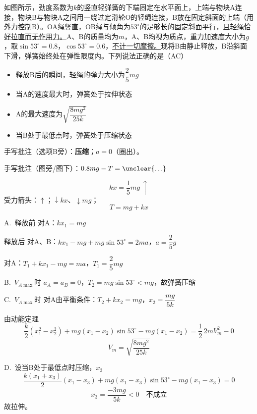 \begin{problem}[14（贴纸印刷题）]
如图所示，劲度系数为$k$的竖直轻弹簧的下端固定在水平面上，上端与物块A连接，物块B与物块A之间用一绕过定滑轮O的轻绳连接，B放在固定斜面的上端（用外力控制B）。OA绳竖直，OB绳与倾角为$53^\circ$的足够长的固定斜面平行，且\underline{轻绳恰好拉直而无作用力。}A、B的质量均为$m$，A、B均视为质点，重力加速度大小为$g$，取$\sin53^\circ=0.8$，$\cos53^\circ=0.6$，\underline{不计一切摩擦。}现将B由静止释放，B沿斜面下滑，弹簧始终处在弹性限度内。下列说法正确的是（AC）%

\begin{itemize}
\item[A.] 释放B后的瞬间，轻绳的弹力大小为$\dfrac{2}{5}mg$ %
\item[B.] 当A的速度最大时，弹簧处于拉伸状态 %
\item[C.] A的最大速度为$\sqrt{\dfrac{8mg^2}{25k}}$ %
\item[D.] 当B处于最低点时，弹簧处于压缩状态 %
\end{itemize}

手写批注（选项B旁）：\textbf{压缩}；$a=0$（圈出）。


手写批注（图旁/图下）：$0.8mg-T=\unclear{\ldots}$ %


\[
kx=\frac{1}{5}mg\ \uparrow
\]
受力箭头：$\uparrow$；$\downarrow kx$、$\downarrow mg$；
\[
T=mg+kx
\]

\begin{solution}
A.\ 释放前 对A：$kx_1=mg$

释放后 对A、B：$kx_1-mg+mg\sin53^\circ=2ma$，\quad $a=\dfrac{2}{5}g$

对A：$T_1+kx_1-mg=ma$，\quad $T_1=\dfrac{2}{5}mg$

B.\ $V_{A\max}$时 $a_A=a_B=0$，\quad $T_2=mg\sin53^\circ<mg$，故弹簧压缩

C.\ $V_{A\max}$时 对A由平衡条件：$T_2+kx_2=mg$，\quad $x_2=\dfrac{mg}{5k}$

由动能定理
\[
\frac{k}{2}\left(x_1^2-x_2^2\right)+mg(x_1-x_2)\sin53^\circ-mg(x_1-x_2)=\frac{1}{2}\,2mV_m^2-0
\]
\[
V_m=\sqrt{\frac{8mg^2}{25k}}
\]

D.\ 设当B处于最低点时压缩，$x_3$
\[
\frac{k(x_1+x_3)}{2}(x_1-x_3)+mg(x_1-x_3)\sin53^\circ-mg(x_1-x_3)=0
\]
\[
x_3=\frac{-3mg}{5k}<0\quad\text{不成立}
\]
故拉伸。
\end{solution}
\end{problem}

